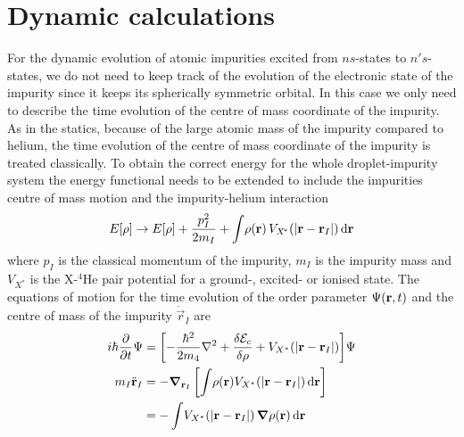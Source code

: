 	\section{Dynamic calculations}\label{sec:td-dft}
		For the dynamic evolution of atomic impurities excited from $ns$-states to $n's$-states, we do not need to keep track of the evolution of the electronic state of the impurity since it keeps its spherically symmetric orbital. In this case we only need to describe the time evolution of the centre of mass coordinate of the impurity. As in the statics, because of the large atomic mass of the impurity compared to helium, the time evolution of the centre of mass coordinate of the impurity is treated classically. To obtain the correct energy for the whole droplet-impurity system the energy functional needs to be extended to include the impurities centre of mass motion and the impurity-helium interaction
		\begin{align}
			E[\rho] \rightarrow E[\rho] + \frac{p^2_I}{2 m_I} + \int \! \rho(\mathbf{r}) \, V_{X^{\!*}}\qty(\abs{\bm{\mathrm{r}}-\bm{\mathrm{r}}_I})\,\mathrm{d}{\bm{\mathrm{r}}} \label{eq33}
		\end{align}
		where $p_I$ is the classical momentum of the impurity, $m_I$ is the impurity mass and $V_{X^{\!*}}$ is the X-$^4$He pair potential for a ground-, excited- or ionised state. The equations of motion for the time evolution of the order parameter $\Psi\qty(\bm{\mathrm{r}},t)$ and the centre of mass of the impurity $\ddot{\vec{r}}_I$ are  
		\begin{align}
			i\hbar\frac{\partial}{\partial t} \Psi &= \qty[-\frac{\hbar^2}{2m_4} \laplacian +\frac{\delta {\cal E}_c}{\delta \rho} + V_{X^*}(|\mathbf{r}- \mathbf{r}_I|)]\Psi\nonumber\\
			m_I \ddot{\mathbf{r}}_I &= - \grad_{\vec{r}_I} \left[  \int \!\rho(\mathbf{r}) V_{X^*}(|\mathbf{r}- \mathbf{r}_I|)\diff{r}  \right] \nonumber \\
			&= -\int \! V_{X^*}(|\mathbf{r}- \mathbf{r}_I|)  \, \grad \rho(\mathbf{r})\diff{r} \label{eq34}
		\end{align}
	

